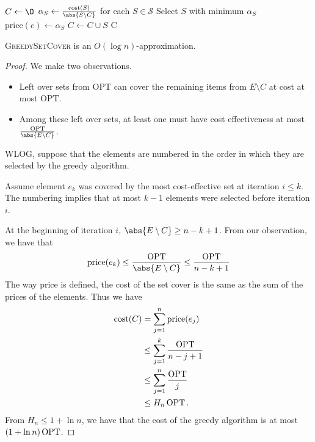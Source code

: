 \begin{algo}
        \State $C \gets \O$
            \State $\alpha_S \gets \frac{\mathrm{cost}(S)}{\abs{S \setminus C}}$
                for each $S \in \mathcal{S}$
            \State Select $S$ with minimum $\alpha_S$
                \State $\mathrm{price}(e) \gets \alpha_S$
            \EndFor
            \State $C \gets C \cup S$
        \EndWhile
        \State \Return C
    \EndFn
\end{algo}
\begin{proposition}
    \textsc{GreedySetCover} is an $O(\log n)$-approximation.
\end{proposition}
\begin{proof}
    We make two observations.
    \begin{itemize}
        \item Left over sets from OPT can cover the remaining items from
        $E \setminus C$ at cost at most OPT.
        \item Among these left over sets, at least one must have cost
        effectiveness at most $\frac{\OPT}{\abs{E \setminus C}}$.
    \end{itemize}
    WLOG, suppose that the elements are numbered in the order in which they 
    are selected by the greedy algorithm.

    Assume element $e_k$ was covered by the most cost-effective set at
    iteration $i \le k$.
    The numbering implies that at most $k - 1$ elements were selected before
    iteration $i$.

    At the beginning of iteration $i$, $\abs{E \setminus C} \ge n - k + 1$.
    From our observation, we have that \[
        \mathrm{price}(e_k) \le \frac{\OPT}{\abs{E \setminus C}}
            \le \frac{\OPT}{n - k + 1}
    \] The way price is defined, the cost of the set cover is the same as
    the sum of the prices of the elements.
    Thus we have \begin{align*}
        \mathrm{cost}(C) &= \sum_{j = 1}^{n} \mathrm{price}(e_j) \\
            &\le \sum_{j = 1}^{k} \frac{\operatorname{OPT}}{n - j + 1} \\
            &\le \sum_{j = 1}^{n} \frac{\operatorname{OPT}}{j} \\
            &\le H_n \operatorname{OPT}.
    \end{align*}
    From $H_n \le 1 + \ln n$, we have that the cost of the greedy algorithm
    is at most $(1 + \ln n) \operatorname{OPT}$.


\end{proof}
